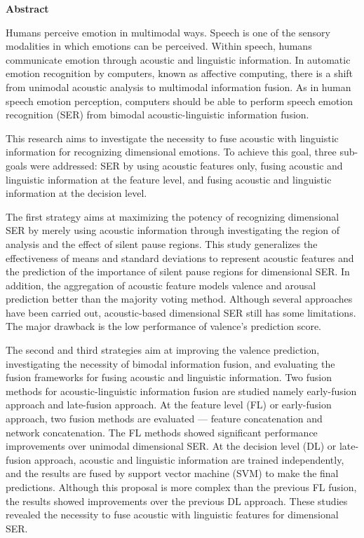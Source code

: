 \renewcommand{\nomname}{ABSTRACT}
\markboth{\nomname}{\nomname}

\strut
\vspace{5pt}

\begin{center}
{\LARGE\bf Abstract}
\end{center}
\vspace{5pt}
Humans perceive emotion in multimodal ways. Speech is one of the sensory
modalities in which emotions can be perceived. Within speech, humans communicate
emotion through acoustic and linguistic information. In automatic emotion
recognition by computers, known as affective computing, there is a shift from
unimodal acoustic analysis to multimodal information fusion. As in human speech
emotion perception, computers should be able to perform speech emotion
recognition (SER) from bimodal acoustic-linguistic information fusion.
 
This research aims to investigate the necessity to fuse acoustic with
linguistic information for recognizing dimensional emotions. To achieve this
goal, three sub-goals were addressed: SER by using acoustic features only,
fusing acoustic and linguistic information at the feature level, and fusing
acoustic and linguistic information at the decision level.

The first strategy aims at maximizing the potency of recognizing dimensional
SER by merely using acoustic information through investigating the region of
analysis and the effect of silent pause regions. This study generalizes the
effectiveness of means and standard deviations to represent acoustic features
and the prediction of the importance of silent pause regions for dimensional
SER. In addition, the aggregation of acoustic feature models valence and
arousal prediction better than the majority voting method. Although several
approaches have been carried out, acoustic-based dimensional SER still has some
limitations. The major drawback is the low performance of valence's prediction
score.

The second and third strategies aim at improving the valence prediction,
investigating the necessity of bimodal information fusion, and evaluating the
fusion frameworks for fusing acoustic and linguistic information. Two fusion
methods for acoustic-linguistic information fusion are studied namely
early-fusion approach and late-fusion approach. At the feature level (FL) or
early-fusion approach, two fusion methods are evaluated --- feature
concatenation and network concatenation. The FL methods showed significant
performance improvements over unimodal dimensional SER.  At the decision level
(DL) or late-fusion approach, acoustic and linguistic information are trained
independently, and the results are fused by support vector machine (SVM) to
make the final predictions.  Although this proposal is more complex than the
previous FL fusion, the results showed improvements over the previous DL
approach. These studies revealed the necessity to fuse acoustic with linguistic
features for dimensional SER.

